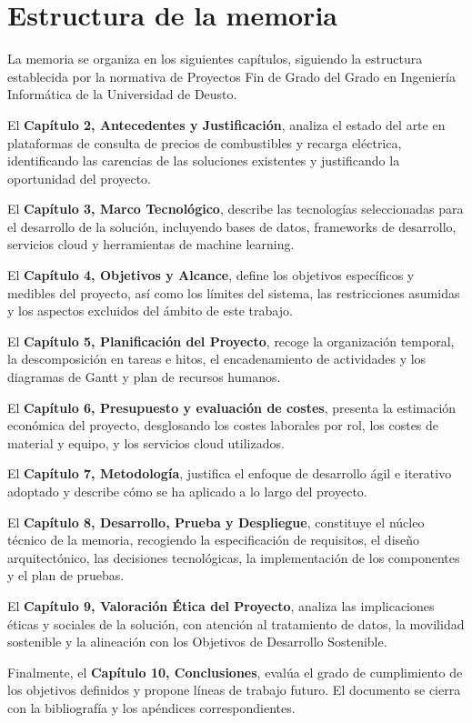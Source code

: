 \section{Estructura de la memoria}
La memoria se organiza en los siguientes capítulos, siguiendo la estructura establecida 
por la normativa de Proyectos Fin de Grado del Grado en Ingeniería Informática de la 
Universidad de Deusto.

El \textbf{Capítulo 2, Antecedentes y Justificación}, analiza el estado del arte en 
plataformas de consulta de precios de combustibles y recarga eléctrica, identificando 
las carencias de las soluciones existentes y justificando la oportunidad del proyecto.

El \textbf{Capítulo 3, Marco Tecnológico}, describe las tecnologías seleccionadas para el desarrollo de la
solución, incluyendo bases de datos, frameworks de desarrollo, servicios cloud y herramientas de machine learning.

El \textbf{Capítulo 4, Objetivos y Alcance}, define los objetivos específicos y 
medibles del proyecto, así como los límites del sistema, las restricciones asumidas 
y los aspectos excluidos del ámbito de este trabajo.

El \textbf{Capítulo 5, Planificación del Proyecto}, recoge la organización temporal, 
la descomposición en tareas e hitos, el encadenamiento de actividades y los diagramas 
de Gantt y plan de recursos humanos.

El \textbf{Capítulo 6, Presupuesto y evaluación de costes}, presenta la estimación económica del proyecto, 
desglosando los costes laborales por rol, los costes de material y equipo, y los 
servicios cloud utilizados.

El \textbf{Capítulo 7, Metodología}, justifica el enfoque de desarrollo ágil e 
iterativo adoptado y describe cómo se ha aplicado a lo largo del proyecto.

El \textbf{Capítulo 8, Desarrollo, Prueba y Despliegue}, constituye el núcleo técnico de la memoria, 
recogiendo la especificación de requisitos, el diseño arquitectónico, las decisiones 
tecnológicas, la implementación de los componentes y el plan de pruebas.

El \textbf{Capítulo 9, Valoración Ética del Proyecto}, analiza las implicaciones 
éticas y sociales de la solución, con atención al tratamiento de datos, la movilidad 
sostenible y la alineación con los Objetivos de Desarrollo Sostenible.

Finalmente, el \textbf{Capítulo 10, Conclusiones}, evalúa el grado de cumplimiento 
de los objetivos definidos y propone líneas de trabajo futuro. El documento se cierra 
con la bibliografía y los apéndices correspondientes.